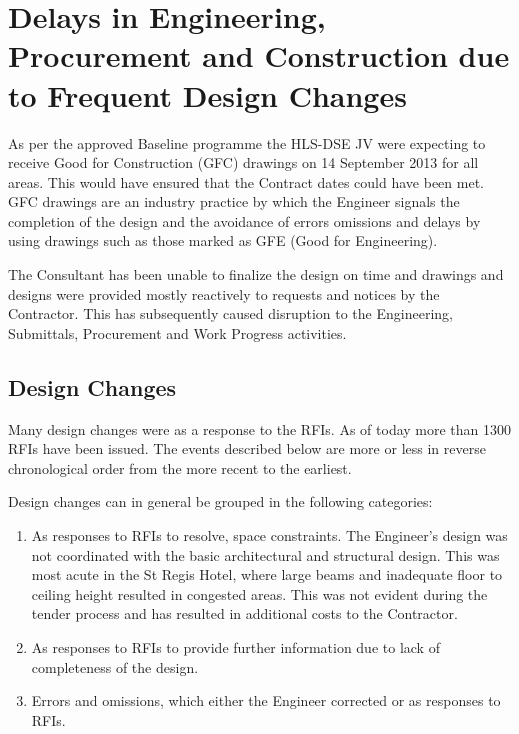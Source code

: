 

\chapter{Delays in Engineering, Procurement and Construction due to Frequent  Design Changes}

As per the approved Baseline programme the HLS-DSE JV were expecting to receive Good for Construction (GFC) drawings on 14 September 2013 for all areas. This would have ensured that the Contract dates could have been met. GFC drawings are an industry practice by which the Engineer signals the completion of the design and the avoidance of errors omissions and delays by using drawings such as those marked as GFE (Good for Engineering). 

The Consultant has been unable to finalize the design on time and drawings and designs were provided mostly reactively to requests and notices by the Contractor. This has subsequently caused disruption to the \JV Engineering, Submittals, Procurement and Work Progress activities.

\section{Design Changes}

Many design changes were as a response to the \JV RFIs. As of today more than 1300 RFIs have been issued. The events described below are more or less in reverse chronological order from the more recent to the earliest.

Design changes can in general be grouped in the following categories:

\begin{enumerate}
\item As responses to RFIs to resolve, space constraints. The Engineer's design was not coordinated with the basic architectural and structural design. This was most acute in the St Regis Hotel, where large beams and inadequate floor to ceiling height resulted in congested  areas. This was not evident during the tender process and has resulted in additional costs to the Contractor.

\item As responses to RFIs to provide further information due to lack of completeness of the design.

\item Errors and omissions, which either the Engineer corrected or as responses to RFIs.
\end{enumerate}


